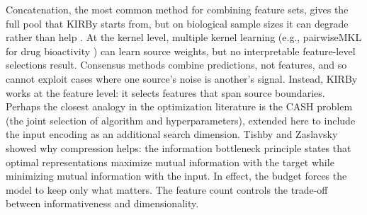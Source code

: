 Concatenation, the most common method for combining feature sets, gives the full pool that KIRBy starts from, but on biological sample sizes it can degrade rather than help \citep{Bellman1961, Stahlschmidt2022}. At the kernel level, multiple kernel learning \citep{Gonen2011} (e.g., pairwiseMKL for drug bioactivity \citep{Cichonska2018}) can learn source weights, but no interpretable feature-level selections result. Consensus methods \citep{Valsecchi2020} combine predictions, not features, and so cannot exploit cases where one source's noise is another's signal. Instead, KIRBy works at the feature level: it selects features that span source boundaries. Perhaps the closest analogy in the optimization literature is the CASH problem \citep{Thornton2013} (the joint selection of algorithm and hyperparameters), extended here to include the input encoding as an additional search dimension. Tishby and Zaslavsky \citep{Tishby2015} showed why compression helps: the information bottleneck principle states that optimal representations maximize mutual information with the target while minimizing mutual information with the input. In effect, the budget forces the model to keep only what matters. The feature count controls the trade-off between informativeness and dimensionality.




